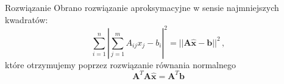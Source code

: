 \begin{frame}
    \begin{block}{Rozwiązanie}
        Obrano rozwiązanie aproksymacyjne w sensie najmniejszych kwadratów:
        \begin{equation*}
            \sum_{i=1}^{n}{\left|\sum_{j=1}^{m}{A_{ij}x_j} - b_i\right|^2} = ||\mathbf{A}\hat{\mathbf{x}} - \mathbf{b}||^2\,,
        \end{equation*}
        które otrzymujemy poprzez rozwiązanie równania normalnego
        \begin{equation*}
            \mathbf{A}^T\mathbf{A}\hat{\mathbf{x}} = \mathbf{A}^T\mathbf{b}
        \end{equation*}
    \end{block}

\end{frame}